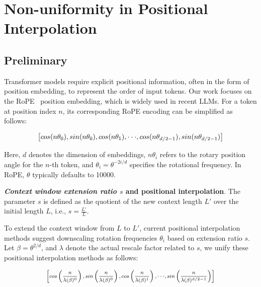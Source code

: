 \section{Non-uniformity in Positional Interpolation}
\label{sec:analysis}

\subsection{Preliminary}

Transformer models require explicit positional information, often in the form of position embedding, to represent the order of input tokens. Our work focuses on the RoPE~\cite{rope} position embedding, which is widely used in recent  LLMs. For a token at position index $n$, its corresponding RoPE encoding can be simplified as follows:

\begin{equation}
		\fontsize{7.8}{7.8} \selectfont
	\label{eq:rope}
	\left[ cos(n\theta_0), sin(n\theta_0), cos(n\theta_1), \cdot\cdot\cdot, cos(n\theta_{d/2-1}), sin(n\theta_{d/2-1}) \right]   
\end{equation}

Here, $d$ denotes the dimension of embeddings, 
$n\theta_i$ refers to the rotary position angle for the $n$-th token, 
and $\theta_i=\theta^{-2i/d}$ specifies the rotational frequency. In RoPE, $\theta$ typically defaults to 10000.

\textbf{\emph{Context window extension ratio $s$} and positional interpolation}. The parameter $s$ is defined as the quotient of the new context length $L'$ over the initial length $L$, i.e., $s=\frac{L'}{L}$.

To extend the context window from $L$ to $L'$, current positional interpolation methods suggest downscaling rotation frequencies $\theta_i$ based on extension ratio $s$. Let $\beta=\theta^{2/d}$, and $\lambda$ denote the actual rescale factor related to $s$, we   unify these positional interpolation methods as follows:

\begin{equation}	
	\fontsize{7.5}{7.5} \selectfont
	\label{eq:unified_rope}
	\begin{aligned}
		\left[cos\left(\frac{n}{\lambda(\beta)^0}\right), sin \left(\frac{n}{\lambda(\beta)^0}\right), cos\left(\frac{n}{\lambda(\beta)^1}\right), \cdot\cdot\cdot,  sin \left(\frac{n}{\lambda(\beta)^{d/2-1}}\right) \right]   
	\end{aligned}
\end{equation}

